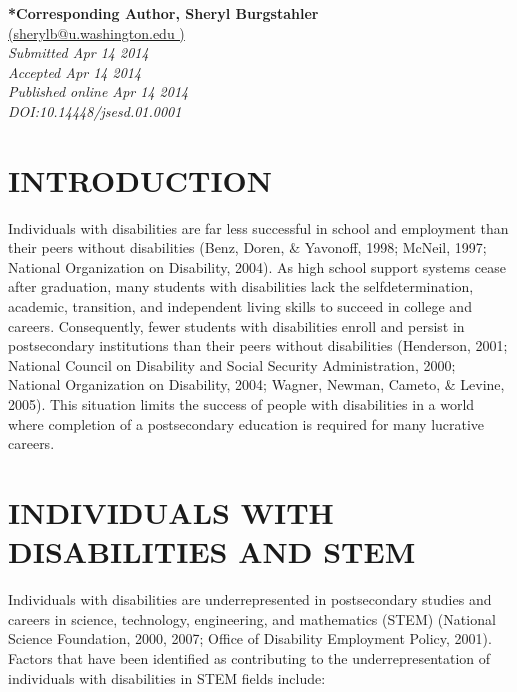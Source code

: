 \documentclass[11.5pt]{sig-alternate} %
\begin{document}
\textbf{*Corresponding Author, Sheryl Burgstahler }\\
\href{mailto: sherylb@u.washington.edu  }{(sherylb@u.washington.edu )} \\
\textit{Submitted  Apr 14 2014}\\
\textit{Accepted Apr 14 2014} \\
\textit{Published online Apr 14 2014} \\
\textit{DOI:10.14448/jsesd.01.0001} \\
\pagebreak
\clearpage
\begin{large}
\section*{INTRODUCTION}
 
Individuals with disabilities are far less successful in school and employment than their peers without disabilities (Benz, Doren, \& Yavonoff, 1998; McNeil, 1997; National Organization on Disability, 2004). As high school support systems cease after graduation, many students with disabilities lack the selfdetermination, academic, transition, and independent living skills to succeed in college and careers. Consequently, fewer students with disabilities enroll and persist in postsecondary institutions than their peers without disabilities (Henderson, 2001; National Council on Disability and Social Security Administration, 2000; National Organization on Disability, 2004; Wagner, Newman, Cameto, \& Levine, 2005). This situation limits the success of people with disabilities in a world where completion of a postsecondary education is required for many lucrative careers.  
 
\section*{INDIVIDUALS WITH DISABILITIES AND STEM}
 
Individuals with disabilities are underrepresented in postsecondary studies and careers in science, technology, engineering, and mathematics (STEM) (National Science Foundation, 2000, 2007; Office of Disability Employment Policy, 2001). Factors that have been identified as contributing to the underrepresentation of individuals with disabilities in STEM fields include: 
 

\end{large}
\end{document}
